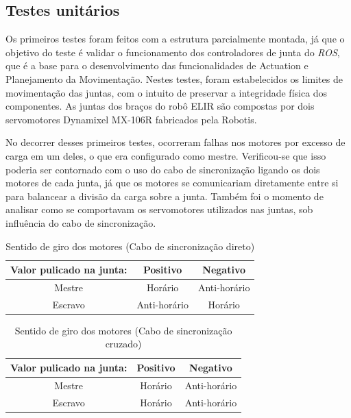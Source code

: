 \subsection{Testes unitários}\label{sec:test_mov_uni}
Os primeiros testes foram feitos com a estrutura parcialmente montada, já que o objetivo do teste é validar o funcionamento dos controladores de junta do \textit{ROS}, que é a base para o desenvolvimento das funcionalidades de Actuation e Planejamento da Movimentação. Nestes testes, foram estabelecidos os limites de movimentação das juntas, com o intuito de preservar a integridade física dos componentes. As juntas dos braços do robô ELIR são compostas por dois servomotores Dynamixel MX-106R fabricados pela Robotis. 

No decorrer desses primeiros testes, ocorreram falhas nos motores por excesso de carga em um deles, o que era configurado como mestre. Verificou-se que isso poderia ser contornado com o uso do cabo de sincronização ligando os dois motores de cada junta, já que os motores se comunicariam diretamente entre si para balancear a divisão da carga sobre a junta. Também foi o momento de analisar como se comportavam os servomotores utilizados nas juntas, sob influência do cabo de sincronização.
\begin{table}[H]
	\centering
	\caption{Sentido de giro dos motores (Cabo de sincronização direto)}
	\begin{tabular}{ccc}	
			\hline
		\multicolumn{1}{r}{Valor pulicado na junta:}      & Positivo         & Negativo         \\ \hline
		Mestre                                            & Horário          & Anti-horário     \\ \hline
		Escravo                                           & Anti-horário     & Horário          \\ \hline
	\end{tabular}
\end{table}

\begin{table}[H]
	\centering
	\caption{Sentido de giro dos motores (Cabo de sincronização cruzado)}
	\begin{tabular}{ccc}
		\hline
		
		\multicolumn{1}{r}{Valor pulicado na junta:}       & Positivo       & Negativo           \\ \hline
		Mestre                                             & Horário        & Anti-horário       \\ \hline
		Escravo                                            & Horário        & Anti-horário       \\ \hline
	\end{tabular}
\end{table}

